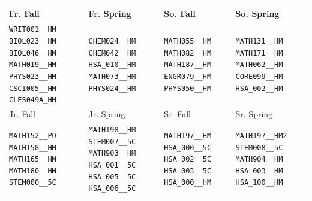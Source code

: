 \begin{tabular}{|p{}|p{}|p{}|p{}|}
    \hline
    Fr. Fall & Fr. Spring & So. Fall & So. Spring\\\hline
    \verb|WRIT001__HM| \verb|BIOL023__HM| \verb|BIOL046__HM| \verb|MATH019__HM| \verb|PHYS023__HM| \verb|CSCI005__HM| \verb|CLES049A_HM|&
    \verb|CHEM024__HM| \verb|CHEM042__HM| \verb|HSA_010__HM| \verb|MATH073__HM| \verb|PHYS024__HM|&
    \verb|MATH055__HM| \verb|MATH082__HM| \verb|MATH187__HM| \verb|ENGR079__HM| \verb|PHYS050__HM|&
    \verb|MATH131__HM| \verb|MATH171__HM| \verb|MATH062__HM| \verb|CORE099__HM| \verb|HSA_002__HM|\\
    \hline
    Jr. Fall & Jr. Spring & Sr. Fall & Sr. Spring\\\hline
    \verb|MATH152__PO| \verb|MATH158__HM| \verb|MATH165__HM| \verb|MATH180__HM| \verb|STEM000__5C|&
    \verb|MATH198__HM| \verb|STEM007__5C| \verb|MATH903__HM| \verb|HSA_001__5C| \verb|HSA_005__5C| \verb|HSA_006__5C|&
    \verb|MATH197__HM| \verb|HSA_000__5C| \verb|HSA_002__5C| \verb|HSA_003__5C| \verb|HSA_000__HM|&
    \verb|MATH197__HM2| \verb|STEM008__5C| \verb|MATH904__HM| \verb|HSA_003__HM| \verb|HSA_100__HM|\\
    \hline
\end{tabular}